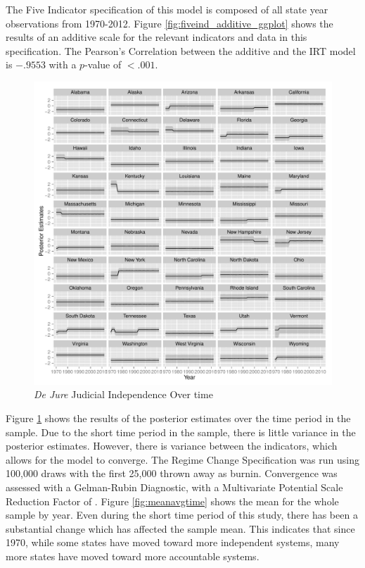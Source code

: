 \documentclass[12pt]{article}
\begin{document}
The Five Indicator specification of this model is composed of all state year observations from 1970-2012.  Figure \ref{fig:fiveind_additive_ggplot} shows the results of an additive scale for the relevant indicators and data in this specification.  The Pearson's Correlation between the additive and the IRT model is $-.9553$  with a $p$-value of $<.001$.

\begin{figure}
	\centering\caption{\textit{De Jure} Judicial Independence Over time}
	\label{fig:fiveind_timeplot}
	\includegraphics[scale=.8]{graphics/fiveind/fiveind_timeplot}
\end{figure}

Figure \ref{fig:fiveind_timeplot} shows the results of the posterior estimates over the time period in the sample.  Due to the short time period in the sample, there is little variance in the posterior estimates.  However, there is variance between the indicators, which allows for the model to converge.  The Regime Change Specification was run using 100,000 draws with the first 25,000 thrown away as burnin.  Convergence was assessed with a Gelman-Rubin Diagnostic, with a Multivariate Potential Scale Reduction Factor of  \citep{Gelman1992}.  Figure \ref{fig:meanavgtime} shows the mean for the whole sample by year.  Even during the short time period of this study, there has been a substantial change which has affected the sample mean.  This indicates that since 1970, while some states have moved toward more independent systems, many more states have moved toward more accountable systems.
\end{document}
